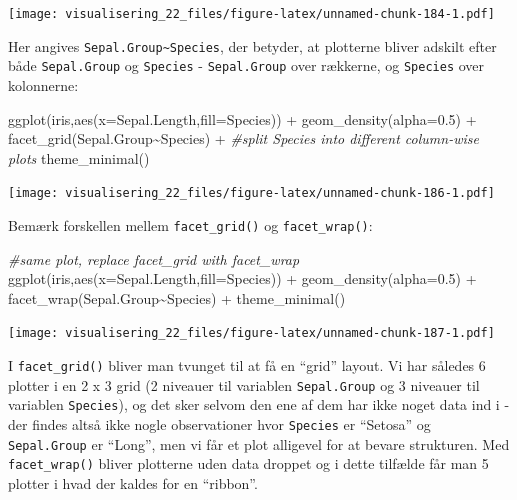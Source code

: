 \documentclass[
]{book}
\newenvironment{Shaded}{\begin{snugshade}}{\end{snugshade}}
\newcommand{\AttributeTok}[1]{\textcolor[rgb]{0.77,0.63,0.00}{#1}}
\newcommand{\CommentTok}[1]{\textcolor[rgb]{0.56,0.35,0.01}{\textit{#1}}}
\newcommand{\FloatTok}[1]{\textcolor[rgb]{0.00,0.00,0.81}{#1}}
\newcommand{\FunctionTok}[1]{\textcolor[rgb]{0.00,0.00,0.00}{#1}}
\newcommand{\NormalTok}[1]{#1}
\newcommand{\SpecialCharTok}[1]{\textcolor[rgb]{0.00,0.00,0.00}{#1}}
\begin{document}
\texttt{[image: visualisering\_22\_files/figure-latex/unnamed-chunk-184-1.pdf]}

Her angives \texttt{Sepal.Group\textasciitilde{}Species}, der betyder, at plotterne bliver adskilt efter både \texttt{Sepal.Group} og \texttt{Species} - \texttt{Sepal.Group} over rækkerne, og \texttt{Species} over kolonnerne:

\begin{Shaded}
\begin{Highlighting}[]
\FunctionTok{ggplot}\NormalTok{(iris,}\FunctionTok{aes}\NormalTok{(}\AttributeTok{x=}\NormalTok{Sepal.Length,}\AttributeTok{fill=}\NormalTok{Species)) }\SpecialCharTok{+} 
  \FunctionTok{geom\_density}\NormalTok{(}\AttributeTok{alpha=}\FloatTok{0.5}\NormalTok{) }\SpecialCharTok{+} 
  \FunctionTok{facet\_grid}\NormalTok{(Sepal.Group}\SpecialCharTok{\textasciitilde{}}\NormalTok{Species) }\SpecialCharTok{+} \CommentTok{\#split Species into different column{-}wise plots}
  \FunctionTok{theme\_minimal}\NormalTok{()}
\end{Highlighting}
\end{Shaded}

\texttt{[image: visualisering\_22\_files/figure-latex/unnamed-chunk-186-1.pdf]}

Bemærk forskellen mellem \texttt{facet\_grid()} og \texttt{facet\_wrap()}:

\begin{Shaded}
\begin{Highlighting}[]
\CommentTok{\#same plot, replace facet\_grid with facet\_wrap}
\FunctionTok{ggplot}\NormalTok{(iris,}\FunctionTok{aes}\NormalTok{(}\AttributeTok{x=}\NormalTok{Sepal.Length,}\AttributeTok{fill=}\NormalTok{Species)) }\SpecialCharTok{+} 
  \FunctionTok{geom\_density}\NormalTok{(}\AttributeTok{alpha=}\FloatTok{0.5}\NormalTok{) }\SpecialCharTok{+} 
  \FunctionTok{facet\_wrap}\NormalTok{(Sepal.Group}\SpecialCharTok{\textasciitilde{}}\NormalTok{Species) }\SpecialCharTok{+} 
  \FunctionTok{theme\_minimal}\NormalTok{()}
\end{Highlighting}
\end{Shaded}

\texttt{[image: visualisering\_22\_files/figure-latex/unnamed-chunk-187-1.pdf]}

I \texttt{facet\_grid()} bliver man tvunget til at få en ``grid'' layout. Vi har således 6 plotter i en 2 x 3 grid (2 niveauer til variablen \texttt{Sepal.Group} og 3 niveauer til variablen \texttt{Species}), og det sker selvom den ene af dem har ikke noget data ind i - der findes altså ikke nogle observationer hvor \texttt{Species} er ``Setosa'' og \texttt{Sepal.Group} er ``Long'', men vi får et plot alligevel for at bevare strukturen. Med \texttt{facet\_wrap()} bliver plotterne uden data droppet og i dette tilfælde får man 5 plotter i hvad der kaldes for en ``ribbon''.
\end{document}
